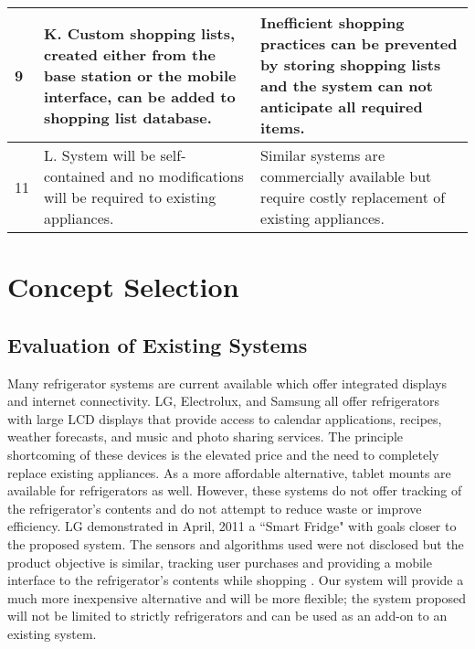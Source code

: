 \documentclass[11pt,letterpaper]{article}
\begin{document}
\begin{table}[h!]
\begin{center}
\begin{tabular}{| p{1.2in} | p{2.5in} |p{2.5in} |}
\hline
9&K. Custom shopping lists, created either from the base station or the mobile interface, can be added to shopping list database.&Inefficient shopping practices can be prevented by storing shopping lists and the system can not anticipate all required items.\\
\hline
11&L. System will be self-contained and no modifications will be required to existing appliances.&Similar systems are commercially available but require costly replacement of existing appliances.\\
\hline
\end{tabular}
\end{center}
\end{table}
\section{Concept Selection}
\subsection{Evaluation of Existing Systems}
Many refrigerator systems are current available which offer integrated displays and internet connectivity. LG, Electrolux, and Samsung all offer refrigerators with large LCD displays that provide access to calendar applications, recipes, weather forecasts, and music and photo sharing services. The principle shortcoming of these devices is the elevated price and the need to completely replace existing appliances. As a more affordable alternative, tablet mounts are available for refrigerators as well.
However, these systems do not offer tracking of the refrigerator's contents and do not attempt to reduce waste or improve efficiency. LG demonstrated in April, 2011 a ``Smart Fridge" with goals closer to the proposed system. The sensors and algorithms used were not disclosed but the product objective is similar, tracking user purchases and providing a mobile interface to the refrigerator's contents while shopping \cite{lg}. Our system will provide a much more inexpensive alternative and will be more flexible; the system proposed will not be limited to strictly refrigerators and can be used as an add-on to an existing system.
\end{document}
